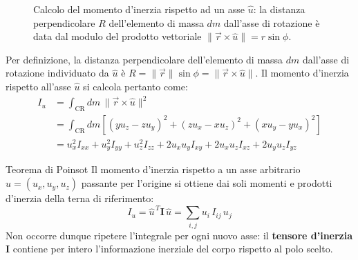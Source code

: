 \begin{figure}[ht]
\centering
{}
\caption{Calcolo del momento d'inerzia rispetto ad un asse $\hat{u}$: la distanza perpendicolare $R$ dell'elemento di massa $dm$ dall'asse di rotazione è data dal modulo del prodotto vettoriale $\|\vec{r} \times \hat{u}\| = r \sin\phi$.}
\end{figure}

Per definizione, la distanza perpendicolare dell'elemento di massa $dm$ dall'asse di rotazione individuato da $\hat{u}$ è $R = \|\vec{r}\| \sin\phi = \|\vec{r} \times \hat{u}\|$. Il momento d'inerzia rispetto all'asse $\hat{u}$ si calcola pertanto come:
\begin{align*}
I_u &= \int_{\text{CR}} dm \, \|\vec{r} \times \hat{u}\|^2 \\
&= \int_{\text{CR}} dm \left[ (yu_z - zu_y)^2 + (zu_x - xu_z)^2 + (xu_y - yu_x)^2 \right] \\
&= u_x^2 I_{xx} + u_y^2 I_{yy} + u_z^2 I_{zz} + 2u_x u_y I_{xy} + 2u_x u_z I_{xz} + 2u_y u_z I_{yz}
\end{align*}

\begin{teorema}{Teorema di Poinsot}
Il momento d'inerzia rispetto a un asse arbitrario $\hat{u} = (u_x, u_y, u_z)$ passante per l'origine
si ottiene dai soli momenti e prodotti d'inerzia della terna di riferimento:
\begin{equation}
    I_u = \hat{u}^{\,T} \mathbf{I} \, \hat{u}
        = \sum_{i,j} u_i \, I_{ij} \, u_j
\end{equation}
Non occorre dunque ripetere l'integrale per ogni nuovo asse: il \textbf{tensore d'inerzia} $\mathbf{I}$
contiene per intero l'informazione inerziale del corpo rispetto al polo scelto.
\end{teorema}

